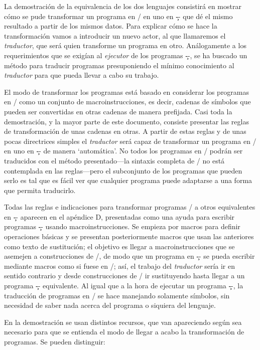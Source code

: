 \newcount\piecab {}
La demostración de la equivalencia de los dos lenguajes consistirá en mostrar cómo se pude
transformar un programa en \C/ en uno en \c-- que dé el mismo resultado a partir de los mismos
datos. Para explicar cómo se hace la transformación vamos a introducir un nuevo actor, al que
llamaremos el {\it traductor}, que será quien transforme un programa en otro. Análogamente a los
requerimientos que se exigían al {\it ejecutor} de los programas \c--, se ha buscado un método para
traducir programas presuponiendo el mínimo conocimiento al {\it traductor} para que pueda llevar a
cabo su trabajo.

El modo de transformar los programas está basado en considerar los programas en \C/ como un conjunto
de macroinstrucciones, es decir, cadenas de símbolos que pueden ser convertidas en otras cadenas de
manera prefijada. Casi toda la demostración, y la mayor parte de este documento, consiste presentar
las reglas de transformación de unas cadenas en otras. A partir de estas reglas y de unas pocas
directrices simples el {\it traductor} será capaz de transformar un programa en \C/ en uno en \c--
de manera ‘automática’. No todos los programas en \C/ podrán ser traducidos con el método
presentado---la sintaxis completa de \C/ no está contemplada en las reglas---pero el subconjunto de los
programas que pueden serlo es tal que es fácil ver que cualquier programa puede adaptarse a una
forma que permita traducirlo.

Todas las reglas e indicaciones para transformar programas \C/ a otros equivalentes en \c-- aparecen
en el apéndice D, presentadas como una ayuda para escribir programas \c-- usando
macroinstrucciones. Se empieza por macros para definir operaciones básicas y se presentan
posteriormente macros que usan las anteriores como texto de sustitución; el objetivo es llegar a
macroinstrucciones que se asemejen a construcciones de \C/, de modo que un programa en \c-- se pueda
escribir mediante macros como si fuese en \C/; así, el trabajo del {\it traductor} sería ir en
sentido contrario y desde construcciones de \C/ ir sustituyendo hasta llegar a un programa \c--
equivalente. Al igual que a la hora de ejecutar un programa \c--, la traducción de programas en \C/
se hace manejando solamente símbolos, sin necesidad de saber nada acerca del programa o siquiera del
lenguaje.

En la demostración se usan distintos recursos, que van apareciendo según sea necesario para que se
entienda el modo de llegar a acabo la transformación de programas. Se pueden distinguir:

